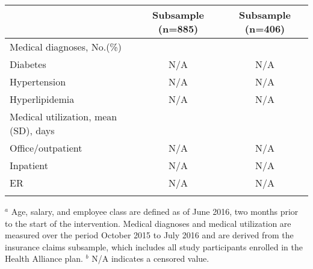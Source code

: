 \documentclass{article}
\begin{document}
\begin{table}[tbp]
\begin{tabularx}{\linewidth}{lCC}
\hspace{1em} &Subsample (n=885)&Subsample (n=406) \tabularnewline
\midrule Medical diagnoses, No.(\%)&& \tabularnewline
\hspace{1em} Diabetes&N/A&N/A \tabularnewline
\hspace{1em} Hypertension&N/A&N/A \tabularnewline
\hspace{1em} Hyperlipidemia&N/A&N/A \tabularnewline
Medical utilization, mean (SD), days&& \tabularnewline
\hspace{1em} Office/outpatient&N/A&N/A \tabularnewline
\hspace{1em} Inpatient&N/A&N/A \tabularnewline
\hspace{1em} ER&N/A&N/A \tabularnewline
\bottomrule \addlinespace[\belowrulesep]

\end{tabularx}
\begin{flushleft}
\footnotesize $^{a}$ Age, salary, and employee class are defined as of June 2016, two months prior to the start of the intervention. Medical diagnoses and medical utilization are measured over the period October 2015 to July 2016 and are derived from the insurance claims subsample, which includes all study participants enrolled in the Health Alliance plan. \newline $^{b}$ N/A indicates a censored value.
\end{flushleft}
\end{table}
\end{document}

